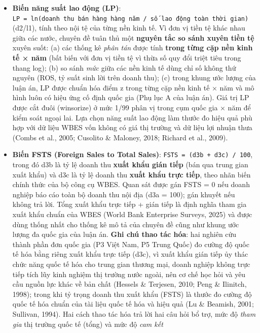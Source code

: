 \documentclass[
  a4paper,
  13pt]{extreport}
\begin{document}
\begin{itemize}
\item
  \textbf{Biến năng suất lao động (LP)}:
  \texttt{LP\ =\ ln(doanh\ thu\ bán\ hàng\ hàng\ năm\ /\ số\ lao\ động\ toàn\ thời\ gian)}
  (d2/l1), tính theo nội tệ của từng nền kinh tế. Vì đơn vị tiền tệ khác
  nhau giữa các nước, chuyên đề tuân thủ một \textbf{nguyên tắc so sánh
  xuyên tiền tệ} xuyên suốt: (a) các thống kê \emph{phân tán} được tính
  \textbf{trong từng cặp nền kinh tế × năm} (bất biến với đơn vị tiền tệ
  vì thừa số quy đổi triệt tiêu trong thang log); (b) so sánh \emph{mức}
  giữa các nền kinh tế dùng chỉ số không thứ nguyên (ROS, tỷ suất sinh
  lời trên doanh thu); (c) trong khung ước lượng của luận án, LP được
  chuẩn hóa điểm z trong từng cặp nền kinh tế × năm và mô hình luôn có
  hiệu ứng cố định quốc gia (Phụ lục A của luận án). Giá trị LP được cắt
  đuôi (winsorize) ở mức 1/99 phân vị trong cụm quốc gia × năm để kiểm
  soát ngoại lai. Lựa chọn năng suất lao động làm thước đo hiệu quả phù
  hợp với dữ liệu WBES vốn không có giá thị trường và dữ liệu lợi nhuận
  thưa (Combs et al., 2005; Cusolito \& Maloney, 2018; Richard et al.,
  2009).
\item
  \textbf{Biến FSTS (Foreign Sales to Total Sales)}:
  \texttt{FSTS\ =\ (d3b\ +\ d3c)\ /\ 100}, trong đó d3b là tỷ lệ doanh
  thu \textbf{xuất khẩu gián tiếp} (bán qua trung gian xuất khẩu) và d3c
  là tỷ lệ doanh thu \textbf{xuất khẩu trực tiếp}, theo nhãn biến chính
  thức của bộ công cụ WBES. Quan sát được gán FSTS = 0 nếu doanh nghiệp
  báo cáo toàn bộ doanh thu nội địa (d3a = 100); gán khuyết nếu không
  trả lời. Tổng xuất khẩu trực tiếp + gián tiếp là định nghĩa tham gia
  xuất khẩu chuẩn của WBES (World Bank Enterprise Surveys, 2025) và được
  dùng thống nhất cho thống kê mô tả của chuyên đề cũng như khung ước
  lượng đa quốc gia của luận án. \textbf{Ghi chú thao tác hóa}: hai
  nghiên cứu thành phần đơn quốc gia (P3 Việt Nam, P5 Trung Quốc) đo
  cường độ quốc tế hóa bằng riêng xuất khẩu trực tiếp (d3c), vì xuất
  khẩu gián tiếp ủy thác chức năng quốc tế hóa cho trung gian thương
  mại, doanh nghiệp không trực tiếp tích lũy kinh nghiệm thị trường nước
  ngoài, nên cơ chế học hỏi và yêu cầu nguồn lực khác về bản chất
  (Hessels \& Terjesen, 2010; Peng \& Ilinitch, 1998); trong khi tỷ
  trọng doanh thu xuất khẩu (FSTS) là thước đo cường độ quốc tế hóa
  chuẩn của tài liệu quốc tế hóa và hiệu quả (Lu \& Beamish, 2001;
  Sullivan, 1994). Hai cách thao tác hóa trả lời hai câu hỏi bổ trợ, mức
  độ \emph{tham gia} thị trường quốc tế (tổng) và mức độ \emph{cam kết
}
\end{itemize}
\end{document}
